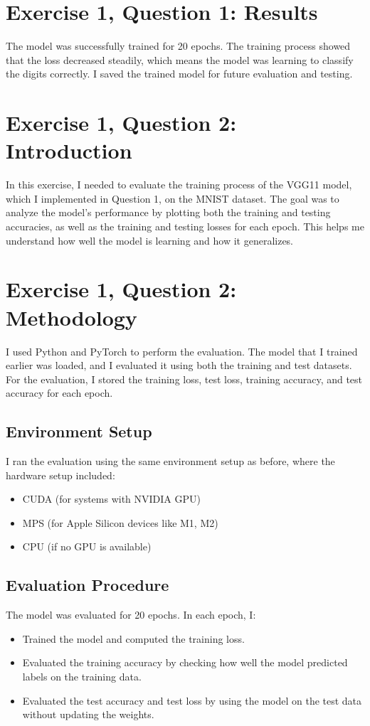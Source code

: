 \documentclass[10pt,letter,notitlepage]{article}
\newcounter{exercise}
\begin{document}
\begin{center}
\section{Exercise 1, Question 1: Results}
The model was successfully trained for 20 epochs. The training process showed that the loss decreased steadily, which means the model was learning to classify the digits correctly. I saved the trained model for future evaluation and testing.

\section{Exercise 1, Question 2: Introduction}
In this exercise, I needed to evaluate the training process of the VGG11 model, which I implemented in Question 1, on the MNIST dataset. The goal was to analyze the model's performance by plotting both the training and testing accuracies, as well as the training and testing losses for each epoch. This helps me understand how well the model is learning and how it generalizes.

\section{Exercise 1, Question 2: Methodology}
I used Python and PyTorch to perform the evaluation. The model that I trained earlier was loaded, and I evaluated it using both the training and test datasets. For the evaluation, I stored the training loss, test loss, training accuracy, and test accuracy for each epoch.

\subsection{Environment Setup}
I ran the evaluation using the same environment setup as before, where the hardware setup included:
\begin{itemize}
    \item CUDA (for systems with NVIDIA GPU)
    \item MPS (for Apple Silicon devices like M1, M2)
    \item CPU (if no GPU is available)
\end{itemize}

\subsection{Evaluation Procedure}
The model was evaluated for 20 epochs. In each epoch, I:
\begin{itemize}
    \item Trained the model and computed the training loss.
    \item Evaluated the training accuracy by checking how well the model predicted labels on the training data.
    \item Evaluated the test accuracy and test loss by using the model on the test data without updating the weights.
\end{itemize}


\end{center}
\end{document}
